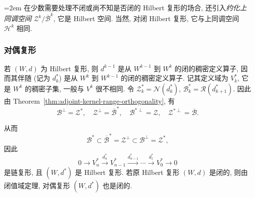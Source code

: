 {\emergencystretch=2em
{在少数需要处理不闭或尚不知是否闭的 Hilbert 复形的场合, 还引入\emph{约化上同调空间} $\mathcal Z^k/\overline{\mathcal B}^k$, 它是 Hilbert 空间. 当然, 对闭 Hilbert 复形, 它与上同调空间 $\mathcal H^k$ 相同.}

\par}
\subsubsection{{对偶复形}}\label{subsec:dual-hilbert-complex}

{若 $(W,d)$ 为 Hilbert 复形, 则 $d^{k-1}$ 是从 $W^{k-1}$ 到 $W^k$ 的闭的稠密定义算子, 因而其伴随 (记为 $d_k^*$) 是从 $W^k$ 到 $W^{k-1}$ 的闭的稠密定义算子. 记其定义域为 $V_k^*$, 它是 $W^k$ 的稠密子集, 一般与 $V^k$ 很不相同. 令 $\mathcal Z_k^*=\mathcal N(d_k^*)$, $\mathcal B_k^*=\mathcal R(d_{k+1}^*)$. 因此由 Theorem~\ref{thm:adjoint-kernel-range-orthogonality}, 有}
\[
\mathcal B^\perp=\mathcal Z^*,\quad\mathcal Z^\perp=\overline{\mathcal B}^*,\quad\mathcal B^{*\perp}=\mathcal Z,\quad\mathcal Z^{*\perp}=\overline{\mathcal B}.
\]

{从而}
\[
\mathcal B^*\subset\overline{\mathcal B}^*=\mathcal Z^\perp\subset\mathcal B^\perp=\mathcal Z^*,
\]
{因此}
\[
0\to V_n^*\xrightarrow{d_n^*}V_{n-1}^*\xrightarrow{d_{n-1}^*}\cdots\xrightarrow{d_1^*}V_0^*\to0
\]
{是链复形, 且 $(W,d^*)$ 是 Hilbert 复形. 若原 Hilbert 复形 $(W,d)$ 是闭的, 则由闭值域定理, 对偶复形 $(W,d^*)$ 也是闭的.}
